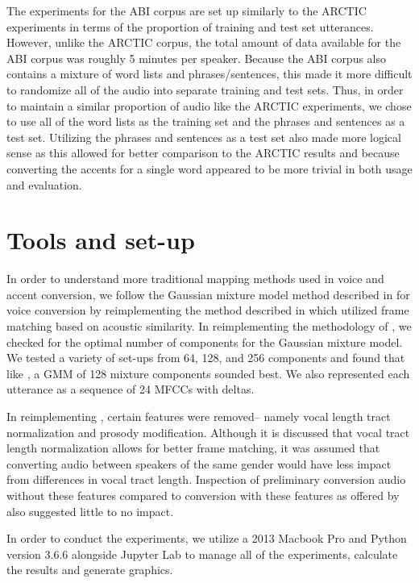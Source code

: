 \documentclass
[
    a4paper,
    twoside,
    12pt,
]
{report}
\begin{document}
The experiments for the ABI corpus are set up similarly to the ARCTIC
experiments in terms of the proportion of training and test set
utterances. However, unlike the ARCTIC corpus, the total amount of data
available for the ABI corpus was roughly 5 minutes per speaker. Because
the ABI corpus also contains a mixture of word lists and
phrases/sentences, this made it more difficult to randomize all of the
audio into separate training and test sets. Thus, in order to maintain a
similar proportion of audio like the ARCTIC experiments, we chose to use
all of the word lists as the training set and the phrases and sentences
as a test set. Utilizing the phrases and sentences as a test set also
made more logical sense as this allowed for better comparison to the
ARCTIC results and because converting the accents for a single word
appeared to be more trivial in both usage and evaluation.

\hypertarget{tools-and-set-up}{%
\section{Tools and set-up}\label{tools-and-set-up}}

In order to understand more traditional mapping methods used in voice
and accent conversion, we follow the Gaussian mixture model method
described in \textcite{toda2007} for voice conversion by reimplementing
the method described in \textcite{aryal2014} which utilized frame
matching based on acoustic similarity. In reimplementing the methodology
of \textcite{aryal2014}, we checked for the optimal number of components
for the Gaussian mixture model. We tested a variety of set-ups from 64,
128, and 256 components and found that like \textcite{aryal2014}, a GMM
of 128 mixture components sounded best. We also represented each
utterance as a sequence of 24 MFCCs with deltas.

In reimplementing \textcite{aryal2014}, certain features were removed--
namely vocal length tract normalization and prosody modification.
Although it is discussed that vocal tract length normalization allows
for better frame matching, it was assumed that converting audio between
speakers of the same gender would have less impact from differences in
vocal tract length. Inspection of preliminary conversion audio without
these features compared to conversion with these features as offered by
\textcite{zhao2018a} also suggested little to no impact.

In order to conduct the experiments, we utilize a 2013 Macbook Pro and
Python version 3.6.6 alongside Jupyter Lab to manage all of the
experiments, calculate the results and generate graphics.
\end{document}

